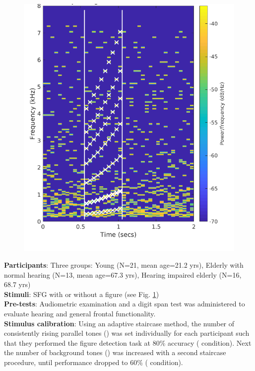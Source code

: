 \documentclass[a0,portrait]{a0poster}
\begin{document}
\begin{multicols}{2}
\setlength{\columnsep}{60pt}
\begin{figure}
	\begin{center}
		\includegraphics[width=1\linewidth]{sfg_stimulus.png}
		\label{fig:stimulus}
	\end{center}
\end{figure}

\textbf{Participants}: Three groups: Young (N=21, mean age=21.2 yrs), Elderly with normal hearing (N=13, mean age=67.3 yrs), Hearing impaired elderly (N=16, 68.7 yrs)\\
\textbf{Stimuli}: SFG with or without a figure (see Fig. \ref{fig:stimulus})\\
\textbf{Pre-tests}: Audiometric examination and a digit span test was administered to evaluate hearing and general frontal functionality.\\
\textbf{Stimulus calibration}: Using an adaptive staircase method, the number of consistently rising parallel tones () was set individually for each participant such that they performed the figure detection task at 80\% accuracy ( condition). Next the number of background
tones () was increased with a second staircase procedure, until
performance dropped to 60\% ( condition).


\end{multicols}
\end{document}
